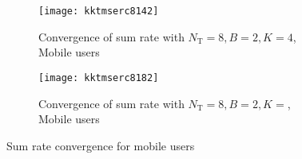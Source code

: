 \begin{figure}
	\centering
	\begin{subfigure}[b]{0.75\textwidth}
		\centering
		\texttt{[image: kktmserc8142]}
		\caption{Convergence of sum rate with $N_\mathrm{T} = 8, B = 2, K = 4$, Mobile users}
		\label{fig_1}
	\end{subfigure}
	\begin{subfigure}[b]{0.75\textwidth}
		\centering
		\texttt{[image: kktmserc8182]}
		\caption{Convergence of sum rate with $N_\mathrm{T} = 8, B = 2, K = $, Mobile users}
		\label{fig-2}
	\end{subfigure}
	\caption{Sum rate convergence for mobile users}
	\label{figIII}
\end{figure}


